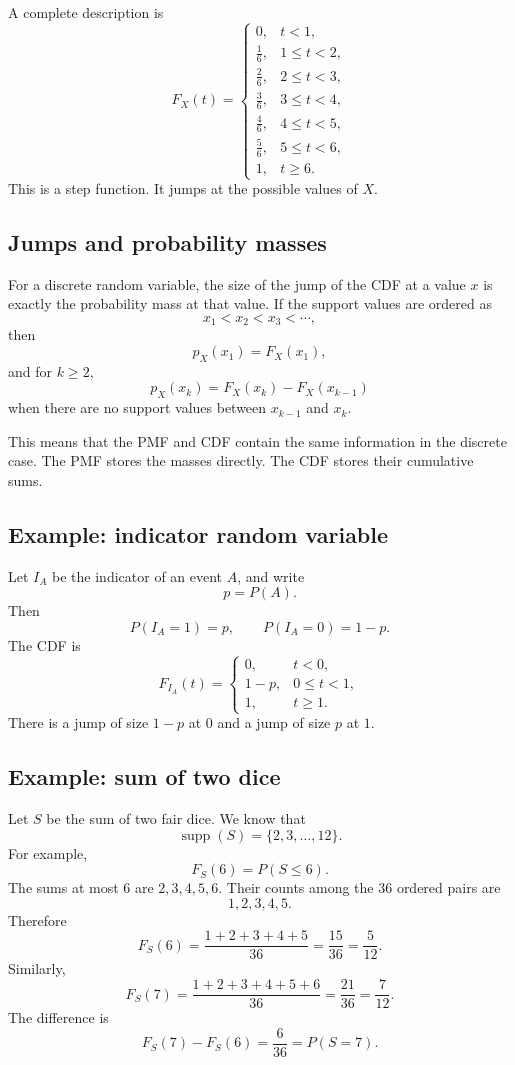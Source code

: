 A complete description is
\[
F_X(t)=
\begin{cases}
0, & t<1,\\
\frac16, & 1\leq t<2,\\
\frac26, & 2\leq t<3,\\
\frac36, & 3\leq t<4,\\
\frac46, & 4\leq t<5,\\
\frac56, & 5\leq t<6,\\
1, & t\geq 6.
\end{cases}
\]
This is a step function. It jumps at the possible values of \(X\).

\subsection*{Jumps and probability masses}

For a discrete random variable, the size of the jump of the CDF at a value \(x\)
is exactly the probability mass at that value. If the support values are ordered
as
\[
x_1<x_2<x_3<\cdots,
\]
then
\[
p_X(x_1)=F_X(x_1),
\]
and for \(k\geq 2\),
\[
p_X(x_k)=F_X(x_k)-F_X(x_{k-1})
\]
when there are no support values between \(x_{k-1}\) and \(x_k\).

This means that the PMF and CDF contain the same information in the discrete
case. The PMF stores the masses directly. The CDF stores their cumulative sums.

\subsection*{Example: indicator random variable}

Let \(I_A\) be the indicator of an event \(A\), and write
\[
p=P(A).
\]
Then
\[
P(I_A=1)=p,\qquad P(I_A=0)=1-p.
\]
The CDF is
\[
F_{I_A}(t)=
\begin{cases}
0, & t<0,\\
1-p, & 0\leq t<1,\\
1, & t\geq 1.
\end{cases}
\]
There is a jump of size \(1-p\) at \(0\) and a jump of size \(p\) at \(1\).

\subsection*{Example: sum of two dice}

Let \(S\) be the sum of two fair dice. We know that
\[
\operatorname{supp}(S)=\{2,3,\ldots,12\}.
\]
For example,
\[
F_S(6)=P(S\leq 6).
\]
The sums at most \(6\) are \(2,3,4,5,6\). Their counts among the \(36\) ordered
pairs are
\[
1,2,3,4,5.
\]
Therefore
\[
F_S(6)=\frac{1+2+3+4+5}{36}=\frac{15}{36}=\frac5{12}.
\]
Similarly,
\[
F_S(7)=\frac{1+2+3+4+5+6}{36}=\frac{21}{36}=\frac7{12}.
\]
The difference is
\[
F_S(7)-F_S(6)=\frac6{36}=P(S=7).
\]

